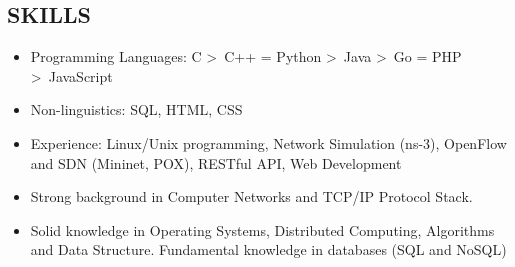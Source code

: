 \documentclass[line]{res}
\begin{document}
\begin{resume}
	\section{SKILLS}
	\begin{itemize}
		\item Programming Languages: C \textgreater \ C++ = Python \textgreater \ Java \textgreater \ Go = PHP \textgreater \ JavaScript
		\item Non-linguistics: SQL, HTML, CSS
		\item Experience: Linux/Unix programming, Network Simulation (ns-3), OpenFlow and SDN (Mininet, POX), RESTful API, Web Development
		\item Strong background in Computer Networks and TCP/IP Protocol Stack.
		\item Solid knowledge in Operating Systems, Distributed Computing, Algorithms and Data Structure. Fundamental knowledge in databases (SQL and NoSQL)

	\end{itemize}


\end{resume}
\end{document}
